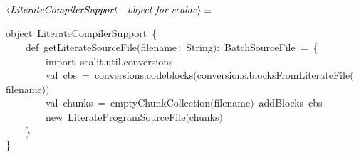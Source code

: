 \documentclass[a4paper,12pt]{article}
\begin{document}
$\left<\mbox{\emph{LiterateCompilerSupport - object for scalac}}\right>\equiv$
\begin{program}{\vem object}~LiterateCompilerSupport~{\small\{}
\\~~~~{\vem def}~getLiterateSourceFile$($filename\,{\rm :}~String$)${\rm :}~BatchSourceFile~=~{\small\{}
\\~~~~~~~~{\vem import}~scalit.util.conversions
\\~~~~~~~~{\vem val}~cbs~=~conversions.codeblocks$($conversions.blocksFromLiterateFile$($filename$)$$)$
\\~~~~~~~~{\vem val}~chunks~=~emptyChunkCollection$($filename$)$~addBlocks~cbs
\\~~~~~~~~{\vem new}~LiterateProgramSourceFile$($chunks$)$
\\~~~~{\small\}}
\\{\small\}}
\end{program}
\end{document}
